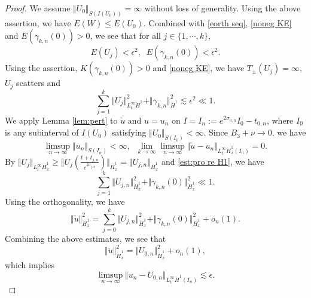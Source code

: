 \documentclass[reqno, 11pt]{amsart}
\numberwithin{equation}{section}
\theoremstyle{plain}
\theoremstyle{definition}
\numberwithin{equation}{section}
\numberwithin{theorem}{section}
\numberwithin{equation}{section}
\numberwithin{equation}{section}
\numberwithin{theorem}{section}
\begin{document}
\begin{proof}
		 We assume $\Vert U_0\Vert_{S(I(U_0))}=\infty$ without loss of generality. Using the above assertion, we have $E(W)\leq E(U_0)$. Combined with \eqref{eorth seq}, \eqref{noneg KE} and $E(\gamma_{k,n}(0))>0$, we see that for all $j\in\{1,\cdots,k\}$,
		\begin{equation*}
		E(U_j)<\epsilon^2,\;\;E(\gamma_{k,n}(0))<\epsilon^2.
		\end{equation*}
		Using the assertion, $K(\gamma_{k,n}(0))>0$ and \eqref{noneg KE}, we have $T_{\pm}(U_j)=\infty$, $U_j$ scatters and
		\begin{equation}\label{est:pro re H1}
		\sum_{j=1}^{k}\Vert U_j\Vert_{ L_{t}^{\infty}\dot H^1}^2+\Vert \gamma_{k,n}\Vert_{\dot H^1}^2\lesssim\epsilon^2\ll 1.
		\end{equation}
		We apply Lemma \ref{lem:pert} to $\widetilde{u}$ and $u=u_n$ on $I=I_n:=e^{2\sigma_{0,n}}I_0 -t_{0,n}$, where $I_0$ is any subinterval of $I(U_0)$ satisfying $\Vert U_0\Vert_{S(I_0)}<\infty$. Since $B_3+\nu \rightarrow0$, we have
		\begin{equation*}
		\limsup_{n \to \infty} \Vert u_n\Vert_{S(I_n)}<\infty,\;\; \lim_{k \to \infty}\limsup_{n \to \infty} \Vert \widetilde{u}-u_n\Vert_{L_{t}^{\infty}\dot H_x^1(I_n)}=0.
		\end{equation*}
		By $ \Vert U_j \Vert_{L_{t}^{\infty}\dot H_x^1}\geq \Vert U_j(\frac{t+t_{j,n}}{e^{2\sigma_{j,n}}}) \Vert_{\dot H_x^1}= \Vert U_{j,n} \Vert_{\dot H_x^1}$ and \eqref{est:pro re H1}, we have
		\begin{equation*}
		\sum_{j=1}^{k} \Vert U_{j,n} \Vert_{\dot H_x^1}^2+\Vert \gamma_{k,n}(0) \Vert_{\dot H_x^1}^2\ll 1.
		\end{equation*}
		Using the orthogonality, we have
		\begin{equation*}
		\Vert \widetilde{u} \Vert_{\dot H_x^1}^2=\sum_{j=0}^{k} \Vert U_{j,n} \Vert_{\dot H_x^1}^2+\Vert \gamma_{k,n}(0) \Vert_{\dot H_x^1}^2+o_n(1).
		\end{equation*}
		Combining the above estimates, we see that 
		\begin{equation*}
		\Vert \widetilde{u} \Vert_{\dot H_x^1}^2= \Vert U_{0,n} \Vert_{\dot H_x^1}^2+o_n(1),
		\end{equation*}
		which implies
		\begin{equation}\label{seq prof app}
		\limsup_{n \to \infty} \Vert u_n-U_{0,n}\Vert_{L_{t}^{\infty}\dot H^1(I_n)}\lesssim\epsilon.
		\end{equation}
		

\end{proof}
\end{document}
